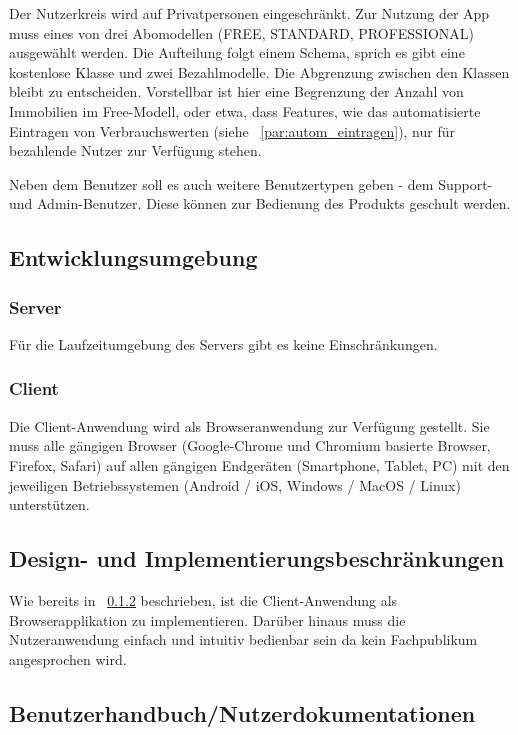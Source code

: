Der Nutzerkreis wird auf Privatpersonen eingeschränkt.
Zur Nutzung der App muss eines von drei Abomodellen (FREE, STANDARD, PROFESSIONAL) ausgewählt werden.
Die Aufteilung folgt einem  Schema, sprich es gibt eine kostenlose Klasse und zwei Bezahlmodelle.
Die Abgrenzung zwischen den Klassen bleibt zu entscheiden.
Vorstellbar ist hier eine Begrenzung der Anzahl von Immobilien im Free-Modell,
oder etwa, dass Features, wie das automatisierte Eintragen von Verbrauchswerten (siehe ~\ref{par:autom_eintragen}),
nur für bezahlende Nutzer zur Verfügung stehen.

Neben dem Benutzer soll es auch weitere Benutzertypen geben - dem Support- und Admin-Benutzer.
Diese können zur Bedienung des Produkts geschult werden.

\subsection{Entwicklungsumgebung}

\subsubsection{Server}

Für die Laufzeitumgebung des Servers gibt es keine Einschränkungen.

\subsubsection{Client}
\label{subsec:OEclient}
Die Client-Anwendung wird als Browseranwendung zur Verfügung gestellt.
Sie muss alle gängigen Browser (Google-Chrome und Chromium basierte Browser, Firefox, Safari)
auf allen gängigen Endgeräten (Smartphone, Tablet, PC) mit den jeweiligen Betriebssystemen
(Android / iOS, Windows / MacOS / Linux) unterstützen.

\subsection{Design- und Implementierungsbeschränkungen}

Wie bereits in ~\ref{subsec:OEclient} beschrieben, ist die Client-Anwendung als Browserapplikation zu implementieren.
Darüber hinaus muss die Nutzeranwendung einfach und intuitiv bedienbar sein da kein Fachpublikum angesprochen wird.

\subsection{Benutzerhandbuch/Nutzerdokumentationen}

